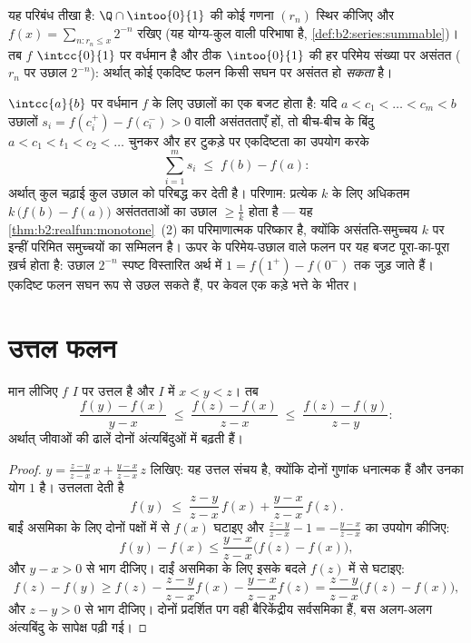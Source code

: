 \begin{example}
यह परिबंध तीखा है: $\Q \cap
\intoo{0}{1}$ की कोई गणना $(r_n)$ स्थिर कीजिए और $f(x) = \sum_{n : r_n \leq x} 2^{-n}$ रखिए (यह
योग्य-कुल वाली परिभाषा है, \cref{def:b2:series:summable})। तब $f$ $\intcc{0}{1}$ पर वर्धमान है और ठीक $\intoo{0}{1}$
की हर परिमेय संख्या पर असंतत ($r_n$ पर उछाल $2^{-n}$): अर्थात् कोई एकदिष्ट
फलन किसी सघन  पर असंतत हो \emph{सकता} है।
\end{example}

\begin{example}[उछाल चढ़ाई से भारी नहीं हो सकते]\label{ex:b2:realfun:jumpbudget}
$\intcc{a}{b}$ पर वर्धमान $f$ के लिए उछालों का एक बजट होता है: यदि $a < c_1 < \dots < c_m < b$ उछालों $s_i = f(c_i^+) - f(c_i^-) > 0$
वाली असंततताएँ हों, तो बीच-बीच के बिंदु $a < c_1 < t_1 < c_2 < \dots$ चुनकर और हर टुकड़े पर
एकदिष्टता का उपयोग करके
\[
\sum_{i=1}^{m} s_i \;\leq\; f(b) - f(a) :
\]
अर्थात् कुल चढ़ाई कुल उछाल को परिबद्ध कर देती है। परिणाम: प्रत्येक $k$
के लिए अधिकतम $k\,\bigl(f(b) - f(a)\bigr)$ असंततताओं का उछाल $\geq \frac1k$ होता है --- यह \cref{thm:b2:realfun:monotone}~(2) का
परिमाणात्मक परिष्कार है, क्योंकि असंतति-समुच्चय $k$ पर इन्हीं परिमित
समुच्चयों का  सम्मिलन है। ऊपर के परिमेय-उछाल वाले फलन पर यह बजट
पूरा-का-पूरा ख़र्च होता है: उछाल $2^{-n}$ स्पष्ट विस्तारित अर्थ में $1 = f(1^+) - f(0^-)$ तक
जुड़ जाते हैं। एकदिष्ट फलन सघन रूप से उछल सकते हैं, पर केवल एक कड़े
भत्ते के भीतर।
\end{example}

\section{उत्तल फलन}

\begin{lemma}[ढाल असमिका]\label{lem:b2:realfun:slopes}
मान लीजिए $f$ $I$ पर उत्तल है और $I$ में $x < y < z$। तब
\[
\frac{f(y) - f(x)}{y - x}
\;\leq\; \frac{f(z) - f(x)}{z - x}
\;\leq\; \frac{f(z) - f(y)}{z - y} :
\]
अर्थात् जीवाओं की ढालें दोनों अंत्यबिंदुओं में बढ़ती हैं।
\end{lemma}

\begin{proof}
$y = \frac{z - y}{z - x}\,x + \frac{y - x}{z - x}\,z$ लिखिए: यह उत्तल संचय है, क्योंकि दोनों गुणांक धनात्मक हैं और उनका
योग $1$ है। उत्तलता देती है
\[
f(y) \;\leq\; \frac{z-y}{z-x}\,f(x) + \frac{y-x}{z-x}\,f(z).
\]
बाईं असमिका के लिए दोनों पक्षों में से $f(x)$ घटाइए और $\frac{z-y}{z-x} - 1 = -\frac{y-x}{z-x}$ का उपयोग कीजिए:
\[
f(y) - f(x) \leq \frac{y - x}{z - x}\bigl(f(z) - f(x)\bigr),
\]
और $y - x > 0$ से भाग दीजिए। दाईं असमिका के लिए इसके बदले $f(z)$ में से घटाइए:
\[
f(z) - f(y) \geq f(z) - \frac{z-y}{z-x}f(x) -
\frac{y-x}{z-x}f(z)
= \frac{z - y}{z - x}\bigl(f(z) - f(x)\bigr),
\]
और $z - y > 0$ से भाग दीजिए। दोनों प्रदर्शित पग वही बैरिकेंद्रीय सर्वसमिका हैं,
बस अलग-अलग अंत्यबिंदु के सापेक्ष पढ़ी गई।
\end{proof}

